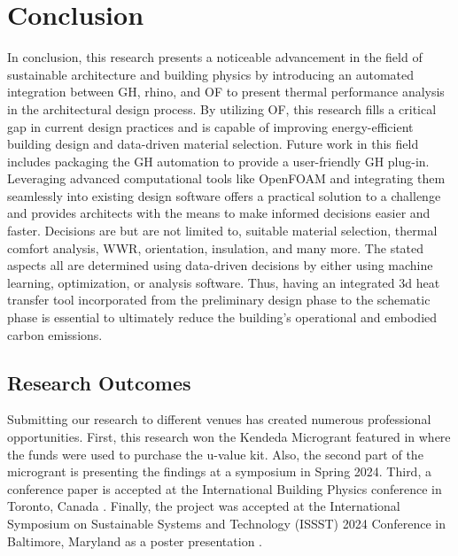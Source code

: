 \chapter{Conclusion}
In conclusion, this research presents a noticeable advancement in the field of sustainable architecture and building physics by introducing an automated integration between GH, rhino, and OF to present thermal performance analysis in the architectural design process. By utilizing OF, this research fills a critical gap in current design practices and is capable of improving energy-efficient building design and data-driven material selection. Future work in this field includes packaging the GH automation to provide a user-friendly GH plug-in. Leveraging advanced computational tools like OpenFOAM and integrating them seamlessly into existing design software offers a practical solution to a challenge and provides architects with the means to make informed decisions easier and faster. Decisions are but are not limited to, suitable material selection, thermal comfort analysis, WWR, orientation, insulation, and many more. The stated aspects all are determined using data-driven decisions by either using machine learning, optimization, or analysis software. Thus, having an integrated 3d heat transfer tool incorporated from the preliminary design phase to the schematic phase is essential to ultimately reduce the building's operational and embodied carbon emissions. 

\section{Research Outcomes}
Submitting our research to different venues has created numerous professional opportunities. First, this research won the Kendeda Microgrant featured in \cite{kendeda} where the funds were used to purchase the u-value kit. Also, the second part of the microgrant is presenting the findings at a symposium in Spring 2024. Third, a conference paper is accepted at the International Building Physics conference in Toronto, Canada \cite{ibpc}. Finally, the project was accepted at the International Symposium on Sustainable Systems and Technology (ISSST) 2024 Conference in
Baltimore, Maryland as a poster presentation \cite{issst}. 


